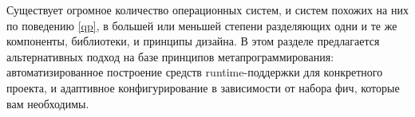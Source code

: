 \label{os}

Существует огромное количество операционных систем, и систем похожих на них по
поведению \ref{qp}, в большей или меньшей степени разделяющих одни и те же
компоненты, библиотеки, и принципы дизайна.
В этом разделе предлагается альтернативных подход на базе принципов
метапрограммирования: автоматизированное построение средств runtime-поддержки
для конкретного проекта, и адаптивное конфигурирование в зависимости от
набора фич, которые вам необходимы.
